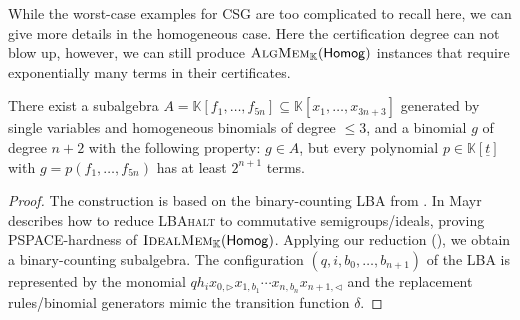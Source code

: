 \documentclass[12pt]{article}
\newcommand{\KK}{\mathbb{K}}
\newcommand{\pclass}[1]{\textsf{\textup{#1}}}
\newcommand{\Homog}{\pclass{Homog}}
\renewcommand{\t}{{\underline t}}
\newcommand{\problemText}[1]{\textsc{#1}\xspace}
\newcommand{\IdealMem}{\problemText{IdealMem}}
\newcommand{\AlgMem}{\problemText{AlgMem}}
\newcommand{\CSG}{\problemText{CSG}}
\newcommand{\LBAhalt}{\problemText{LBAhalt}}
\newcommand{\cclass}[1]{\textsf{\textup{#1}}\xspace}
\newcommand{\PSPACE}{\cclass{PSPACE}}
\begin{document}
While the worst-case examples for \CSG are too complicated to recall here, we can give more details in the homogeneous case. Here the certification degree can not blow up, however, we can still produce $\AlgMem_\KK(\Homog)$ instances that require exponentially many terms in their certificates.

\begin{theorem}
There exist a subalgebra  $A = \KK[f_1,\dots,f_{5n}] \subseteq \KK[x_1,\dots,x_{3n+3}]$ generated by single variables and homogeneous binomials of degree $\leq 3$, and a binomial $g$ of degree $n+2$ with the following property:
$g \in A$, but every polynomial $p \in \KK[\t]$ with $g=p(f_1,\dots,f_{5n})$ has at least $2^{n+1}$ terms.
\end{theorem}
\begin{proof}
The construction is based on the binary-counting LBA from . In \cite[Theorem 17]{Mayr1997} Mayr describes how to reduce \LBAhalt to commutative semigroups/ideals, proving \PSPACE-hardness of $\IdealMem_\KK(\Homog)$. Applying our reduction (), we obtain a binary-counting subalgebra.
The configuration $(q,i,b_0,\dots,b_{n+1})$ of the LBA is represented by the monomial $qh_i x_{0,{\triangleright}} x_{1,b_1} \dotsm x_{n,b_n}x_{n+1,{\triangleleft}}$ and the replacement rules/binomial generators mimic the transition function $\delta$.


\end{proof}
\end{document}
